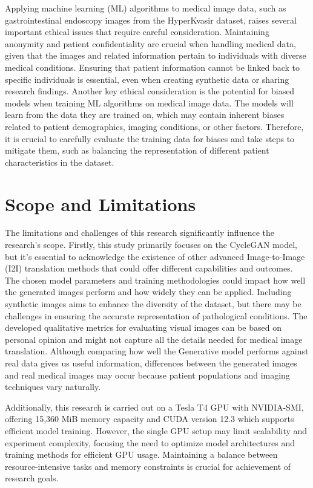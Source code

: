\documentclass[UKenglish,12pt]{master-style}
\begin{document}
Applying machine learning (ML) algorithms to medical image data, such as gastrointestinal endoscopy images from the HyperKvasir dataset, raises several important ethical issues that require careful consideration. Maintaining anonymity and patient confidentiality are crucial when handling medical data, given that the images and related information pertain to individuals with diverse medical conditions. Ensuring that patient information cannot be linked back to specific individuals is essential, even when creating synthetic data or sharing research findings. Another key ethical consideration is the potential for biased models when training ML algorithms on medical image data. The models will learn from the data they are trained on, which may contain inherent biases related to patient demographics, imaging conditions, or other factors. Therefore, it is crucial to carefully evaluate the training data for biases and take steps to mitigate them, such as balancing the representation of different patient characteristics in the dataset.

\section{Scope and Limitations}

The limitations and challenges of this research significantly influence the research's scope. Firstly, this study primarily focuses on the CycleGAN model, but it's essential to acknowledge the existence of other advanced Image-to-Image (I2I) translation methods that could offer different capabilities and outcomes. The chosen model parameters and training methodologies could impact how well the generated images perform and how widely they can be applied. Including synthetic images aims to enhance the diversity of the dataset, but there may be challenges in ensuring the accurate representation of pathological conditions. The developed qualitative metrics for evaluating visual images can be based on personal opinion and might not capture all the details needed for medical image translation. Although comparing how well the Generative model performs against real data gives us useful information, differences between the generated images and real medical images may occur because patient populations and imaging techniques vary naturally.

Additionally, this research is carried out on a Tesla T4 GPU with NVIDIA-SMI, offering 15,360 MiB memory capacity and CUDA version 12.3 which supports efficient model training. However, the single GPU setup may limit scalability and experiment complexity, focusing the need to optimize model architectures and training methods for efficient GPU usage. Maintaining a balance between resource-intensive tasks and memory constraints is crucial for achievement of research goals.
\end{document}
